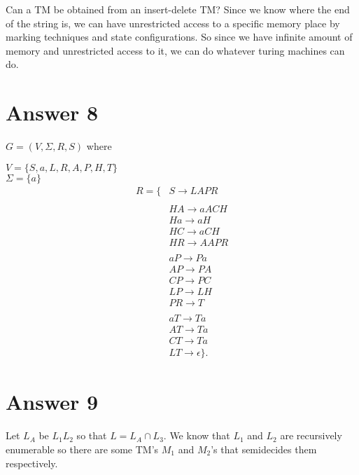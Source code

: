 \documentclass[12pt]{article}
\begin{document}
    \qquad Can a TM be obtained from an insert-delete TM? Since we know where the end of the string is, we can have unrestricted access to a specific memory place by marking techniques and state configurations. So since we have infinite amount of memory and unrestricted access to it, we can do whatever turing machines can do.


  \newpage
\section*{Answer 8}

  \qquad $G = (V, \Sigma, R, S)$ where
  \begin{center}
    $V=\{S,a,L,R,A,P,H,T\}$\\
    $\Sigma=\{a\}$\\
    \begin{align*}
      R=\{ & S \rightarrow LAPR\\\\
           & HA \rightarrow aACH\\
           & Ha \rightarrow aH\\
           & HC \rightarrow aCH\\
           & HR \rightarrow AAPR\\\\
           & aP \rightarrow Pa\\
           & AP \rightarrow PA\\
           & CP \rightarrow PC\\
           & LP \rightarrow LH\\
           & PR \rightarrow T\\\\
           & aT \rightarrow Ta\\
           & AT \rightarrow Ta\\
           & CT \rightarrow Ta\\
           & LT \rightarrow \epsilon\}.
    \end{align*}
  \end{center}


\section*{Answer 9}

  \qquad Let $L_A$ be $L_1L_2$ so that $L=L_A\cap L_3$. We know that $L_1$ and $L_2$ are recursively enumerable so there are some TM's $M_1$ and $M_2$'s that semidecides them respectively.
\end{document}
